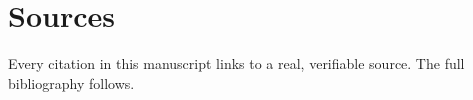 
\chapter{Sources}
\label{app:sources}

Every citation in this manuscript links to a real, verifiable source. The full bibliography follows.

\printbibliography[heading=none]
